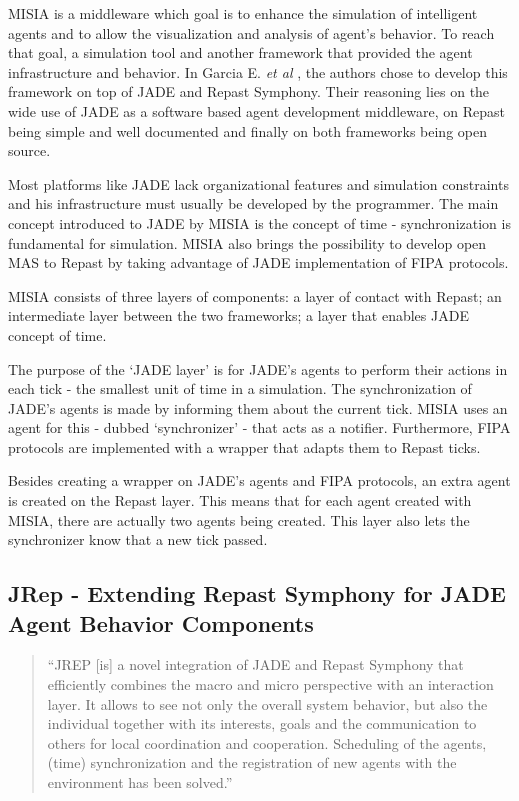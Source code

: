 	MISIA is a middleware which goal is to enhance the simulation of intelligent agents and to allow the visualization and analysis of agent's behavior. To reach that goal, a simulation tool and another framework that provided the agent infrastructure and behavior. In Garcia E. \textit{et al} \cite{garcia2011misia}, the authors chose to develop this framework on top of JADE and Repast Symphony. Their reasoning lies on the wide use of JADE as a software based agent development middleware, on Repast being simple and well documented and finally on both frameworks being open source.

	Most platforms like JADE lack organizational features and simulation constraints and his infrastructure must usually be developed by the programmer. The main concept introduced to JADE by MISIA is the concept of time - synchronization is fundamental for simulation. MISIA also brings the possibility to develop open MAS to Repast by taking advantage of JADE implementation of FIPA protocols.

	MISIA consists of three layers of components: a layer of contact with Repast; an intermediate layer between the two frameworks; a layer that enables JADE concept of time.

	The purpose of the `JADE layer' is for JADE's agents to perform their actions in each tick - the smallest unit of time in a simulation. The synchronization of JADE's agents is made by informing them about the current tick. MISIA uses an agent for this - dubbed `synchronizer' - that acts as a notifier. Furthermore, FIPA protocols are implemented with a wrapper that adapts them to Repast ticks.

	Besides creating a wrapper on JADE's agents and FIPA protocols, an extra agent is created on the Repast layer. This means that for each agent created with MISIA, there are actually two agents being created. This layer also lets the synchronizer know that a new tick passed.

\subsection{JRep - Extending Repast Symphony for JADE Agent Behavior Components}
\begin{quote}
	``JREP [is] a novel integration of JADE and Repast Symphony that efficiently combines the macro and micro perspective with an interaction layer. It allows to see not only the overall system behavior, but also the individual together with its interests, goals and the communication to
	others for local coordination and cooperation. Scheduling of the agents, (time) synchronization and the registration of new agents with the environment has been solved.'' \cite{gormer2011jrep}
\end{quote}

